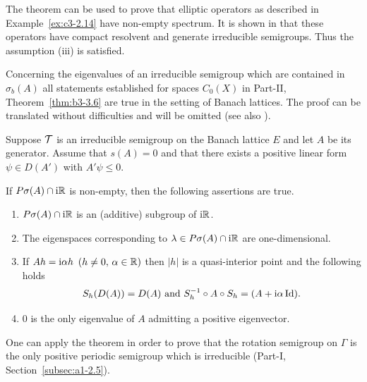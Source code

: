 The theorem can be used to prove that elliptic operators as described in Example~\ref{ex:c3-2.14} have non-empty spectrum.
It is shown in \textcite{amann:1983} that these operators have compact resolvent and generate irreducible semigroups.
Thus the assumption (iii) is satisfied.

Concerning the eigenvalues of an irreducible semigroup which are contained in $\sigma_{b}(A)$ all statements established for spaces $C_{0}(X)$ in Part-II, Theorem~\ref{thm:b3-3.6} are true in the setting of Banach lattices.
The proof can be translated without difficulties and will be omitted (see also \textcite[Theorem~2.6]{greiner:1982}).
\begin{theorem}\label{thm:c3-3.8}
	Suppose $\mathcal{T}$ is an irreducible semigroup
    on the Banach lattice $E$ and let $A$ be its generator.
	Assume that $s(A) = 0$ and that there exists a positive linear form $\psi \in D(A')$ with $A'\psi \leq 0$. 

    If\/ $P\sigma(A)\cap \mathrm{i}\mathbb{R} $ is non-empty, then the following assertions are true.
	\begin{enumerate}[\upshape (i)]
		\item 
			$P\sigma(A)\cap \mathrm{i}\mathbb{R} $ is an (additive) subgroup of\/ $\mathrm{i}\mathbb{R} $.
	
		\item 
		The eigenspaces corresponding to $\lambda \in P\sigma(A)\cap \mathrm{i}\mathbb{R} $ are one-dimensional.
	
		\item 
		If\/ $Ah = \mathrm{i}\alpha h$ $(h \neq 0,\, \alpha \in \mathbb{R} )$ then $|h|$ is a quasi-interior point and the following holds
		\begin{equation}\label{eq:c3-3.13}
			S_{h}(D(A)) = D(A) \text{ and } S_{h}^{-1}\circ A\circ S_{h} = (A + \mathrm{i}\alpha\operatorname{Id}).
		\end{equation}
		
		\item 
		$0$ is the only eigenvalue of\/ $A$ admitting a positive eigenvector.
	\end{enumerate}
\end{theorem}
One can apply the theorem in order to prove that the rotation semigroup on $\Gamma$ 
 is the only positive periodic semigroup
which is irreducible (\cf Part-I, Section~\ref{subsec:a1-2.5}).%
%
%
